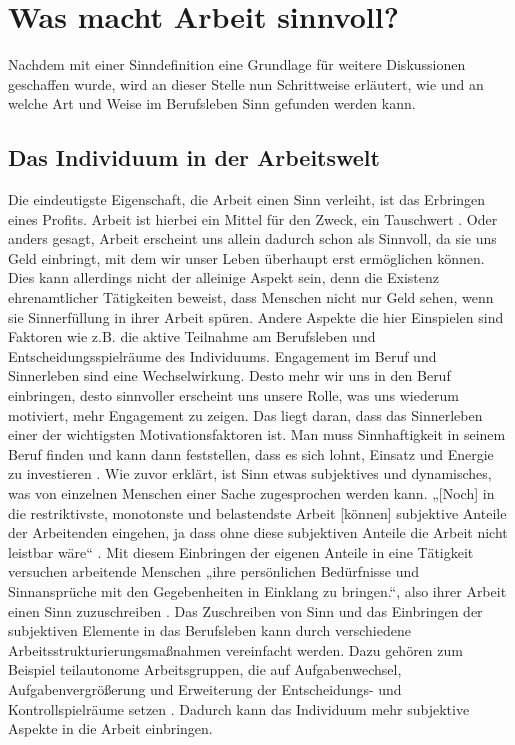 \chapter{Was macht Arbeit sinnvoll?}
Nachdem mit einer Sinndefinition eine Grundlage für weitere Diskussionen geschaffen wurde, wird an dieser Stelle nun Schrittweise erläutert, wie und an welche Art und Weise im Berufsleben Sinn gefunden werden kann.
\section{Das Individuum in der Arbeitswelt}
Die eindeutigste Eigenschaft, die Arbeit einen Sinn verleiht, ist das Erbringen eines Profits. Arbeit ist hierbei ein Mittel für den Zweck, ein Tauschwert \cite[S.192-193]{Voswinkel.2018}. Oder anders gesagt, Arbeit erscheint uns allein dadurch schon als Sinnvoll, da sie uns Geld einbringt, mit dem wir unser Leben überhaupt erst ermöglichen können. Dies kann allerdings nicht der alleinige Aspekt sein, denn die Existenz ehrenamtlicher Tätigkeiten beweist, dass Menschen nicht nur Geld sehen, wenn sie Sinnerfüllung in ihrer Arbeit spüren. 
Andere Aspekte die hier Einspielen sind Faktoren wie z.B. die aktive Teilnahme am Berufsleben und Entscheidungsspielräume des Individuums. Engagement im Beruf und Sinnerleben sind eine Wechselwirkung. Desto mehr wir uns in den Beruf einbringen, desto sinnvoller erscheint uns unsere Rolle, was uns wiederum motiviert, mehr Engagement zu zeigen. Das liegt daran, dass das Sinnerleben einer der wichtigsten Motivationsfaktoren ist. Man muss Sinnhaftigkeit in seinem Beruf finden und kann dann feststellen, dass es sich lohnt, Einsatz und Energie zu investieren \cite[S.205-206]{FluterHoffmann.2018}. Wie zuvor erklärt, ist Sinn etwas subjektives und dynamisches, was von einzelnen Menschen einer Sache zugesprochen werden kann. „[Noch] in die restriktivste, monotonste und belastendste Arbeit [können] subjektive Anteile der Arbeitenden eingehen, ja dass ohne diese subjektiven Anteile die Arbeit nicht leistbar wäre“ \cite[S.79]{SenghaasKnobloch.2008}. Mit diesem Einbringen der eigenen Anteile in eine Tätigkeit versuchen arbeitende Menschen „ihre persönlichen Bedürfnisse und Sinnansprüche mit den Gegebenheiten in Einklang zu bringen.“, also ihrer Arbeit einen Sinn zuzuschreiben \cite[S.66]{Freier.2018}. Das Zuschreiben von Sinn und das Einbringen der subjektiven Elemente in das Berufsleben kann durch verschiedene Arbeitsstrukturierungsmaßnahmen vereinfacht werden. Dazu gehören zum Beispiel teilautonome Arbeitsgruppen, die auf Aufgabenwechsel, Aufgabenvergrößerung und Erweiterung der Entscheidungs- und Kontrollspielräume setzen \cite[S.67]{Freier.2018}. Dadurch kann das Individuum mehr subjektive Aspekte in die Arbeit einbringen.
